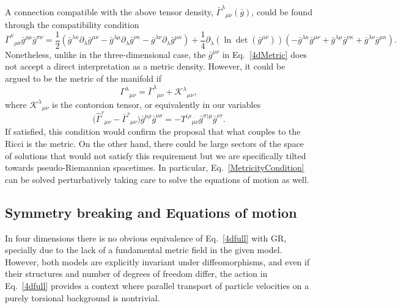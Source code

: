 \documentclass[twocolumn,
  showpacs,showkeys,prd,superscriptaddress]{revtex4-1}
\begin{document}
A connection compatible with the above tensor density,   $\bar\Gamma^{\lambda}{}_{\mu\nu}(\bar{g})$, could be found through the compatibility condition
\begin{dmath*}
  \bar{\Gamma}^{\kappa}{}_{\rho\sigma}\bar{g}^{\rho\mu}\bar{g}^{\sigma\nu} = \frac{1}{2} (\bar{g}^{\lambda\kappa}\partial_\lambda\bar{g}^{\mu\nu} -\bar{g}^{\lambda\mu}\partial_\lambda\bar{g}^{\nu\kappa} -\bar{g}^{\lambda\nu}\partial_\lambda\bar{g}^{\mu\kappa}) + \frac{1}{4}\partial_\lambda (\ln\det(\bar{g}^{\mu\nu})) (-\bar{g}^{\lambda\kappa}\bar{g}^{\mu\nu} +\bar{g}^{\lambda\mu}\bar{g}^{\nu\kappa} +\bar{g}^{\lambda\nu}\bar{g}^{\mu\kappa}).
\end{dmath*}
Nonetheless, unlike in the three-dimensional case, the $\bar{g}^{\mu\nu}$ in Eq.~\eqref{4dMetric} does not accept a direct interpretation as a metric density. However, it could be argued to be the metric of the manifold if
$$\Gamma^\lambda{}_{\mu\nu} = \bar{\Gamma}^\lambda{}_{\mu\nu}+\mathcal{K}^\lambda{}_{\mu\nu},$$
where $\mathcal{K}^\lambda{}_{\mu\nu}$ is the contorsion tensor, or equivalently in our variables
\begin{dmath}
  \label{MetricityCondition}
  \Big(\hat{\Gamma}^{\tau}{}_{\mu\nu}-\bar{\Gamma}^{\tau}{}_{\mu\nu}\Big)\bar{g}^{\mu\rho}\bar{g}^{\nu\sigma} =
  -T^{(\rho}{}_{\mu\nu}\bar{g}^{\sigma)\mu}\bar{g}^{\nu\tau}	.
\end{dmath} 
If satisfied, this condition would confirm the proposal that what couples to the Ricci is the metric. On the other hand, there could be large sectors of the space of solutions that would not satisfy this requirement but we are specifically tilted towards pseudo-Riemannian spacetimes. In particular, Eq.~\eqref{MetricityCondition} can be solved perturbatively taking care to solve the equations of motion as well.



\subsection*{Symmetry breaking and Equations of motion }

In four dimensions there is no obvious equivalence of Eq.~\eqref{4dfull} with GR, specially due to the lack of a fundamental metric field in the given model. However, both models are explicitly invariant under diffeomorphisms, and even if their structures and number of degrees of freedom differ, the action in Eq.~\eqref{4dfull} provides a context where parallel transport of particle velocities on a purely torsional background is nontrivial.
\end{document}
